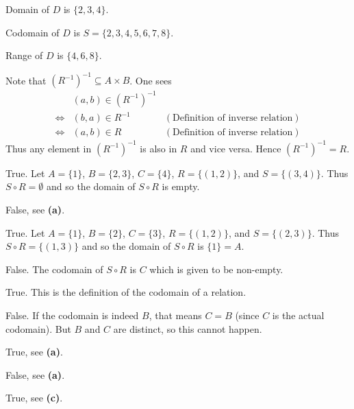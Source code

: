\begin{questions}
\begin{partquestions}{\roman*}
        \item \begin{partquestions}{\alph*}
            \item Domain of $D$ is $\{2, 3, 4\}$.
            \item Codomain of $D$ is $S = \{2,3,4,5,6,7,8\}$.
            \item Range of $D$ is $\{4, 6, 8\}$.
        \end{partquestions}
    \end{partquestions}

    \item Note that $\left(R^{-1}\right)^{-1} \subseteq A \times B$. One sees
    \begin{align*}
        &(a, b) \in \left(R^{-1}\right)^{-1}\\
        \iff& (b, a) \in R^{-1} & (\text{Definition of inverse relation})\\
        \iff& (a, b) \in R & (\text{Definition of inverse relation})
    \end{align*}
    Thus any element in $\left(R^{-1}\right)^{-1}$ is also in $R$ and vice versa. Hence $\left(R^{-1}\right)^{-1} = R$.
    
    \item \begin{partquestions}{\alph*}
        \item True. Let $A = \{1\}$, $B = \{2, 3\}$, $C = \{4\}$, $R = \{(1,2)\}$, and $S = \{(3,4)\}$. Thus $S \circ R = \emptyset$ and so the domain of $S \circ R$ is empty.
        \item False, see \textbf{(a)}.
        \item True. Let $A = \{1\}$, $B = \{2\}$, $C = \{3\}$, $R = \{(1,2)\}$, and $S = \{(2,3)\}$. Thus $S \circ R = \{(1,3)\}$ and so the domain of $S \circ R$ is $\{1\} = A$.
        \item False. The codomain of $S \circ R$ is $C$ which is given to be non-empty.
        \item True. This is the definition of the codomain of a relation.
        \item False. If the codomain is indeed $B$, that means $C = B$ (since $C$ is the actual codomain). But $B$ and $C$ are distinct, so this cannot happen.
        \item True, see \textbf{(a)}.
        \item False, see \textbf{(a)}.
        \item True, see \textbf{(c)}.
    \end{partquestions}


\end{questions}
